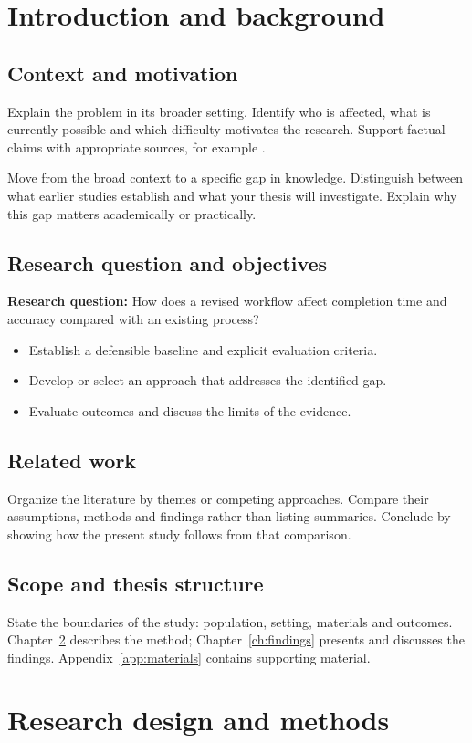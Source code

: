 \documentclass[11pt,a4paper,oneside]{report}
\begin{document}
\chapter{Introduction and background}
\label{ch:introduction}
\section{Context and motivation}
Explain the problem in its broader setting. Identify who is affected, what is
currently possible and which difficulty motivates the research. Support factual
claims with appropriate sources, for example \cite{example}.

Move from the broad context to a specific gap in knowledge. Distinguish between
what earlier studies establish and what your thesis will investigate. Explain
why this gap matters academically or practically.
\section{Research question and objectives}
\textbf{Research question:} How does a revised workflow affect completion time
and accuracy compared with an existing process?
\begin{itemize}
\item Establish a defensible baseline and explicit evaluation criteria.
\item Develop or select an approach that addresses the identified gap.
\item Evaluate outcomes and discuss the limits of the evidence.
\end{itemize}
\section{Related work}
Organize the literature by themes or competing approaches. Compare their
assumptions, methods and findings rather than listing summaries. Conclude by
showing how the present study follows from that comparison.
\section{Scope and thesis structure}
State the boundaries of the study: population, setting, materials and outcomes.
Chapter~\ref{ch:methods} describes the method; Chapter~\ref{ch:findings} presents
and discusses the findings. Appendix~\ref{app:materials} contains supporting material.

\chapter{Research design and methods}
\label{ch:methods}
\end{document}

